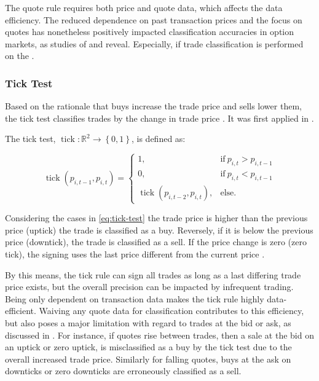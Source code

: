 The quote rule requires both price and quote data, which affects the data efficiency. The reduced dependence on past transaction prices and the focus on quotes has nonetheless positively impacted classification accuracies in option markets, as studies of \textcite[][886]{savickasInferringDirectionOption2003} and \textcite[][3]{grauerOptionTradeClassification2022} reveal. Especially, if trade classification is performed on the .


\subsubsection{Tick Test}\label{sec:tick-test}

Based on the rationale that buys increase the trade price and sells lower them, the tick test classifies trades by the change in trade price \autocite[][271]{easleyDiscerningInformationTrade2016}. It was first applied in \textcites[][244]{holthausenEffectLargeBlock1987}[][240]{hasbrouckTradesQuotesInventories1988}.

The tick test, $\operatorname{tick}\colon \mathbb{R}^2 \to \left\{0,1\right\}$, is defined as:

\begin{equation}
  \operatorname{tick}(p_{i, t-1}, p_{i,t})=
  \begin{cases}
    1,                                         & \text{if}\ p_{i, t} > p_{i, t-1} \\
    0,                                         & \text{if}\ p_{i, t} < p_{i, t-1} \\
    \operatorname{tick}(p_{i,t-2}, p_{i,t}), & \text{else}.
  \end{cases}
  \label{eq:tick-test}
\end{equation}


Considering the cases in \cref{eq:tick-test} the trade price is higher than the previous price (uptick) the trade is classified as a buy. Reversely, if it is below the previous price (downtick), the trade is classified as a sell. If the price change is zero (zero tick), the signing uses the last price different from the current price \autocite[][3]{leeInferringTradeDirection1991}.

By this means, the tick rule can sign all trades as long as a last differing trade price exists, but the overall precision can be impacted by infrequent trading. Being only dependent on transaction data makes the tick rule highly data-efficient. Waiving any quote data for classification contributes to this efficiency, but also poses a major limitation with regard to trades at the bid or ask, as discussed in \textcite[][557--558]{finucaneDirectTestMethods2000}. For instance, if quotes rise between trades, then a sale at the bid on an uptick or zero uptick, is misclassified as a buy by the tick test due to the overall increased trade price. Similarly for falling quotes, buys at the ask on downticks or zero downticks are erroneously classified as a sell.


